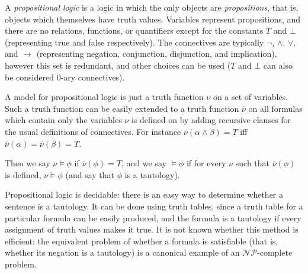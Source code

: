 \documentclass[12pt]{article}
\begin{document}
A \emph{propositional logic} is a logic in which the only objects are \emph{propositions}, that is, objects which themselves have truth values.  Variables represent propositions, and there are no relations, functions, or quantifiers except for the constants $T$ and $\bot$ (representing true and false respectively).  The connectives are typically $\neg$, $\wedge$, $\vee$, and $\rightarrow$ (representing negation, conjunction, disjunction, and implication), however this set is redundant, and other choices can be used ($T$ and $\bot$ can also be considered $0$-ary connectives).

A model for propositional logic is just a truth function $\nu$ on a set of variables.  Such a truth function can be easily extended to a truth function $\overline{\nu}$ on all formulas which contain only the variables $\nu$ is defined on by adding recursive clauses for the usual definitions of connectives.  For instance $\overline{\nu}(\alpha\wedge\beta)=T$ iff $\overline{\nu}(\alpha)=\overline{\nu}(\beta)=T$.

Then we say $\nu\models\phi$ if $\overline{\nu}(\phi)=T$, and we say $\models\phi$ if for every $\nu$ such that $\overline{\nu}(\phi)$ is defined, $\nu\models\phi$ (and say that $\phi$ is a tautology).

Propositional logic is decidable: there is an easy way to determine whether a sentence is a tautology.  It can be done using truth tables, since a truth table for a particular formula can be easily produced, and the formula is a tautology if every assignment of truth values makes it true.  It is not known whether this method is efficient: the equivalent problem of whether a formula is satisfiable (that is, whether its negation is a tautology) is a canonical example of an $\mathcal{NP}$-complete problem.
\end{document}
